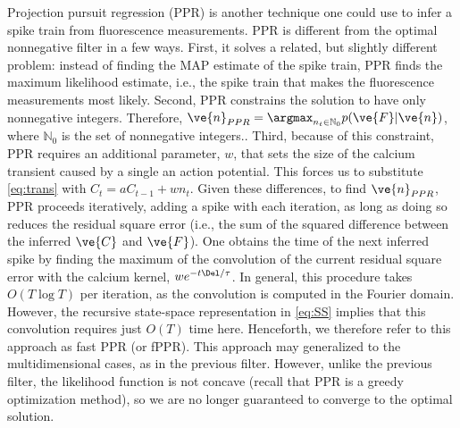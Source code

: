 \documentclass[12pt]{article}
\newcommand{\xT}{\ve{C}}
\newcommand{\nT}{\ve{n}}
\newcommand{\zT}{\ve{n}}
\newcommand{\FT}{\ve{F}}
\newcommand{\CaT}{\Cav}
\begin{document}
Projection pursuit regression (PPR) is another technique one could use to infer a spike train from fluorescence measurements.  PPR is different from the optimal nonnegative filter in a few ways.  First, it solves a related, but slightly different problem: instead of finding the MAP estimate of the spike train, PPR finds the maximum likelihood estimate, i.e., the spike train that makes the fluorescence measurements most likely.  Second, PPR constrains the solution to have only nonnegative integers. Therefore, $\zT_{PPR}=\argmax_{n_t \in \mathbb{N}_0} p(\FT | \zT)$, where $\mathbb{N}_0$ is the set of nonnegative integers.. 
%
%
Third, because of this constraint, PPR requires an additional parameter, $w$, that sets the size of the calcium transient caused by a single an action potential.  This forces us to substitute \eqref{eq:trans}  with $C_t = a C_{t-1} + w n_t$.  %
%
%
%
Given these differences, to find $\zT_{PPR}$, PPR proceeds iteratively, adding a spike with each iteration, as long as doing so reduces the residual square error (i.e., the sum of the squared difference between the inferred $\xT$ and $\FT$). One obtains the time of the next inferred spike by finding the maximum of the convolution of the current residual square error with the calcium kernel, $w e^{-t\Del/\tau}$. In general, this procedure takes $O(T \log T)$ per iteration, as the convolution is computed in the Fourier domain.  However, the recursive state-space representation in \eqref{eq:SS} implies that this convolution requires just $O(T)$ time here.  Henceforth, we therefore refer to this approach as fast PPR (or fPPR). This approach may generalized to the multidimensional cases, as in the previous filter. However, unlike the previous filter, the likelihood function is not concave (recall that PPR is a greedy optimization method), so we are no longer guaranteed to converge to the optimal solution. %
\end{document}
